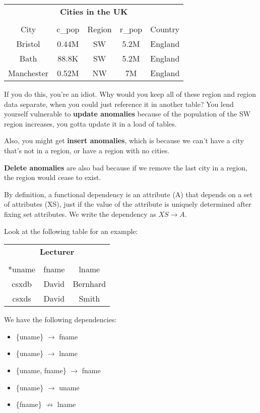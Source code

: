 \documentclass[11pt,a4paper,titlepage,dvipsnames,cmyk]{scrartcl}
\begin{document}
\begin{center}
    \begin{tabular}{c c c c c}
        \multicolumn{5}{c}{\textbf{Cities in the UK}} \\
        \multicolumn{5}{c}{} \\ \hline
        City & c\_pop & Region & r\_pop & Country \\ \hhline{=====}
        Bristol & 0.44M & SW & 5.2M & England \\ 
        Bath & 88.8K & SW & 5.2M & England \\ 
        Manchester & 0.52M & NW & 7M & England \\ \hline
    \end{tabular}
\end{center}

If you do this, you're an idiot. Why would you keep all of these region
and region data separate, when you could just reference it in another
table? You lend yourself vulnerable to \textbf{update anomalies} because
of the population of the SW region increases, you gotta update it in a
load of tables.

Also, you might get \textbf{insert anomalies}, which is because we can't
have a city that's not in a region, or have a region with no cities.

\textbf{Delete anomalies} are also bad because if we remove the last city
in a region, the region would cease to exist.

By definition, a functional dependency is an attribute (A) that depends on a
set of attributes (XS), just if the value of the attribute is uniquely
determined after fixing set attributes. We write the dependency as $XS
\rightarrow A$.

Look at the following table for an example:

\begin{center}
    \begin{tabular}{c c c}
        \multicolumn{3}{c}{\textbf{Lecturer}} \\
        \multicolumn{3}{c}{} \\ \hline
        *uname & fname & lname \\ \hhline{===}
        csxdb & David & Bernhard \\ \hline
        csxds & David & Smith \\ \hline
    \end{tabular}
\end{center}

\begin{minipage}{\textwidth}
We have the following dependencies:
\begin{itemize}
    \item \{uname\} $\rightarrow$ fname
    \item \{uname\} $\rightarrow$ lname
    \item \{uname, fname\} $\rightarrow$ fname
    \item \{uname\} $\rightarrow$ uname
    \item \{fname\} $\not \rightarrow$ lname
\end{itemize}
\end{minipage}
\end{document}
